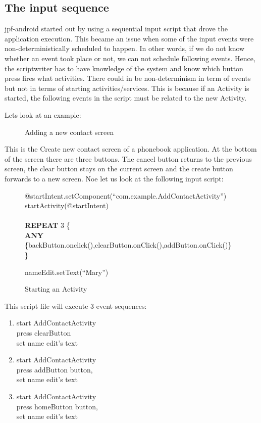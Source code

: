 \documentclass{sig-alternate}
\begin{document}
\subsection{The input sequence}
jpf-android started out by using a sequential input script that drove the application execution. This became an issue when some of the
input events were non-deterministically scheduled to happen. In other words, if we do not know whether an event took place or
not, we can not schedule following events. Hence, the scriptwriter has to have knowledge of the system and
know which button press fires what activities. There could in be non-determinism in term of events but not in terms of starting
activities/services. This is because if an Activity is started, the following events in the script must be related to the new Activity. 

Lets look at an example:
\begin{figure}
\centering
{}
\caption{Adding a new contact screen}
\end{figure}

This is the Create new contact screen of a phonebook application. At the bottom of the screen there are three buttons. The cancel button
returns to the previous screen, the clear button stays on the current screen and the create button forwards to a new screen. Noe  let us
look at the following input script:

\begin{figure}
{\small
{\sf 
@startIntent.setComponent(``com.example.AddContactActivity'')\\
startActivity(@startIntent)\\
\\
\textbf{REPEAT} 3 \{\\
\textbf{ANY} \{backButton.onclick(),clearButton.onClick(),addButton.onClick()\}\\
\}

nameEdit.setText(``Mary'')
}
}
\caption{Starting an Activity}
\end{figure}

This script file will execute 3 event sequences:
\begin{enumerate}
 \item start AddContactActivity\\
press clearButton\\
set name edit's text
 \item start AddContactActivity\\ 
 press addButton button, \\
 set name edit's text
 \item start AddContactActivity\\
 press homeButton button, \\
 set name edit's text
\end{enumerate}
\end{document}
